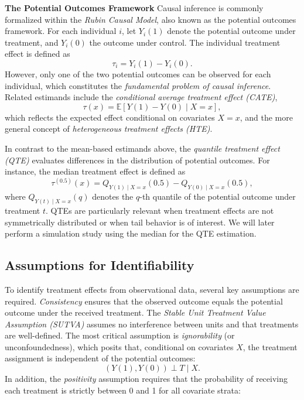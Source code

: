 \textbf{The Potential Outcomes Framework } Causal inference is commonly formalized within the \textit{Rubin Causal Model}, also known as the potential outcomes framework. For each individual $i$, let $Y_i(1)$ denote the potential outcome under treatment, and $Y_i(0)$ the outcome under control. The individual treatment effect is defined as
\begin{equation}
\tau_i = Y_i(1) - Y_i(0).
\end{equation}
However, only one of the two potential outcomes can be observed for each individual, which constitutes the \textit{fundamental problem of causal inference}. Related estimands include the \textit{conditional average treatment effect (CATE)},
\begin{equation}
\tau(x) = \mathbb{E}[Y(1) - Y(0) \mid X = x],
\end{equation}
which reflects the expected effect conditional on covariates $X = x$, and the more general concept of \textit{heterogeneous treatment effects (HTE)}.

In contrast to the mean-based estimands above, the \textit{quantile treatment effect (QTE)} evaluates differences in the distribution of potential outcomes. For instance, the median treatment effect is defined as
\begin{equation}
\tau^{(0.5)}(x) = Q_{Y(1) \mid X = x}(0.5) - Q_{Y(0) \mid X = x}(0.5),
\end{equation}
where $Q_{Y(t) \mid X = x}(q)$ denotes the $q$-th quantile of the potential outcome under treatment $t$. QTEs are particularly relevant when treatment effects are not symmetrically distributed or when tail behavior is of interest. We will later perform a simulation study using the median for the QTE estimation.

\subsection{Assumptions for Identifiability}

To identify treatment effects from observational data, several key assumptions are required. \textit{Consistency} ensures that the observed outcome equals the potential outcome under the received treatment. The \textit{Stable Unit Treatment Value Assumption (SUTVA)} assumes no interference between units and that treatments are well-defined. The most critical assumption is \textit{ignorability} (or unconfoundedness), which posits that, conditional on covariates $X$, the treatment assignment is independent of the potential outcomes:
\begin{equation}
(Y(1), Y(0)) \perp T \mid X.
\end{equation}
In addition, the \textit{positivity} assumption requires that the probability of receiving each treatment is strictly between 0 and 1 for all covariate strata:

